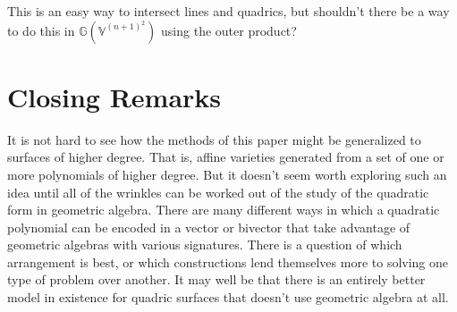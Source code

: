 \documentclass{birkjour}
\theoremstyle{definition}
\theoremstyle{remark}
\numberwithin{equation}{section}
\newcommand{\G}{\mathbb{G}}
\newcommand{\V}{\mathbb{V}}
\begin{document}
This is an easy way to intersect lines and quadrics, but shouldn't there be
a way to do this in $\G(\V^{(n+1)^2})$ using the outer product?

\section{Closing Remarks}

It is not hard to see how the methods of this paper might be generalized
to surfaces of higher degree.  That is, affine varieties generated from a
set of one or more polynomials of higher degree.  But it doesn't seem worth
exploring such an idea until all of the wrinkles can be worked out of the study
of the quadratic form in geometric algebra.  There are many different ways
in which a quadratic polynomial can be encoded in a vector or bivector that
take advantage of geometric algebras with various signatures.  There is a question
of which arrangement is best, or which constructions lend themselves more to solving
one type of problem over another.  It may well be that there is an entirely
better model in existence for quadric surfaces that doesn't use geometric algebra at all.






\end{document}
